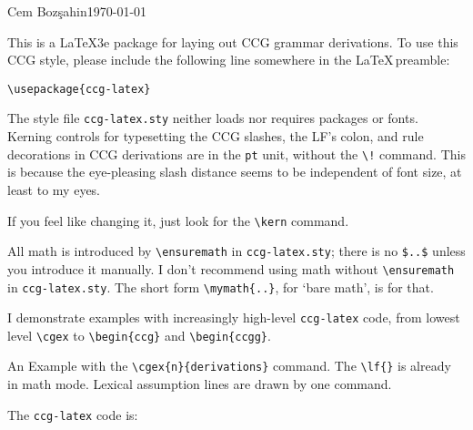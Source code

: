 \documentclass[11pt]{article}
\begin{document}
\hfill{\small Cem Boz\c{s}ahin}\hfill\today\medskip\bigskip

\noindent This is a \LaTeX 3e package for laying out CCG grammar derivations.
To use this CCG style, please include the following line somewhere in the \LaTeX\,preamble:\medskip

\begin{verbatim}
\usepackage{ccg-latex}
\end{verbatim}\medskip


The style file \verb|ccg-latex.sty| neither loads nor requires  packages or fonts. Kerning controls for typesetting the CCG slashes, the  LF's colon, and rule decorations in CCG derivations are in the \verb|pt| unit, without the \verb|\!| command. This is because the eye-pleasing slash distance seems to be independent of font size, at least to my eyes.

If you feel like changing it, just look for the \verb|\kern| command. 

All math is introduced by \verb|\ensuremath| in \verb|ccg-latex.sty|; 
there is no \verb|$..$| unless you introduce it manually. I don't recommend
using math without \verb|\ensuremath| in \verb|ccg-latex.sty|.
The short form \verb|\mymath{..}|, for `bare math', is for that.


I demonstrate examples with increasingly high-level \verb|ccg-latex| code, from lowest
level \verb|\cgex| to \verb|\begin{ccg}| and \verb|\begin{ccgg}|.\bigskip

An Example with the \verb|\cgex{n}{derivations}| command. The \verb|\lf{}| is already in math mode.
Lexical assumption lines are drawn by one command.
\bigskip

\medskip\bigskip

The \verb|ccg-latex| code is:
\end{document}
